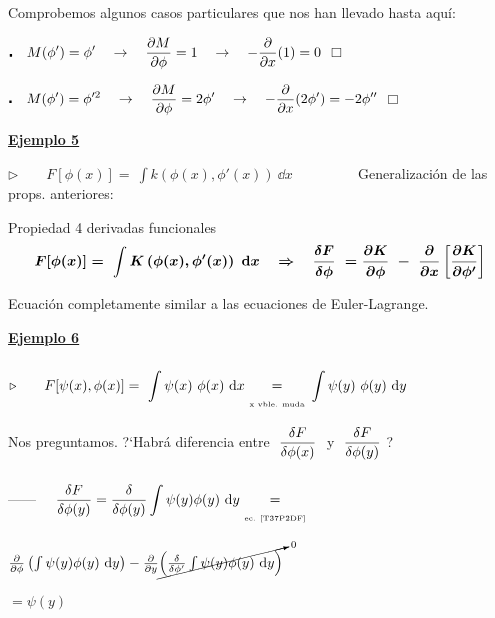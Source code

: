 \vspace{5mm} Comprobemos algunos casos particulares que nos han llevado hasta aquí:

\hspace{1cm}$\centerdot \quad \displaystyle M(\phi')=\phi' \quad \to \quad \pdv{M}{\phi}=1 \quad \to \quad -\pdv{x}(1)=0$ \hspace{4.4cm}$\Box$

\hspace{1cm}$\centerdot \quad \displaystyle M(\phi')=\phi'^2 \quad \to \quad \pdv{M}{\phi}=2\phi' \quad \to \quad -\pdv{x}(2\phi')=-2\phi''$ \hspace{3cm}$\Box$


\vspace{10mm}
\begin{large}{\underline{\textbf{Ejemplo 5}}}\end{large} $\triangleright \qquad F[\phi(x)]=\ \displaystyle \int k (\phi(x),\phi'(x))\ \dd x$	 $\qquad \qquad$ Generalización de las props. anteriores:

\vspace{5mm}
\begin{myblock}{Propiedad 4 derivadas funcionales}
\begin{equation}
 \label{T37P2DF}
 \boldsymbol{
F[\phi(x)]=\ \displaystyle \int K \left(\phi(x),\phi'(x) \right)\ \dd x
\quad \Rightarrow \quad 
\fdv{F}{\phi} \ = \pdv{K}{\phi} \ - \ \pdv{x} \left[ \pdv{K}{\phi'} \right]
 }	
 \end{equation}
\end{myblock}

Ecuación completamente similar a las ecuaciones de Euler-Lagrange.


\vspace{10mm}
\begin{large}{\underline{\textbf{Ejemplo 6}}}\end{large} $\triangleright \qquad F[\psi(x),\phi(x)]=\ \displaystyle \int \psi(x)\ \phi(x)\ \dd x   \ \begin{matrix} \\ = \\ \text{\tiny{x vble. muda}} \end{matrix} \ \int \psi(y)\ \phi(y)\ \dd y  $	

Nos preguntamos. ?`Habrá diferencia entre $\ \displaystyle \fdv{F}{\phi(x)}\ $ y $\ \displaystyle \fdv{F}{\phi(y)}\ $?

\vspace{2mm} ------ $\displaystyle \quad  \fdv{F}{\phi(y)} = \fdv{\phi(y)} \int \psi(y)\phi(y)\ \dd y 
 \ \begin{matrix} \\ = \\ \text{\tiny{ec. \ref{T37P2DF}}} \end{matrix} \ $
 \begin{small}
$\pdv{\phi} \left( \int \psi(y)\phi(y)\ \dd y \right) - \pdv{y} \cancelto{0}{\left( \fdv{\phi'} \int \psi(y)\phi(y)\ \dd y \right) }$ \end{small} 
$= \psi(y)$

